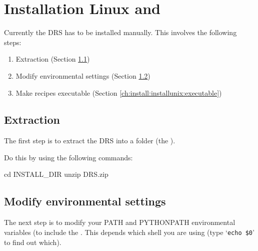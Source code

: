 \section{Installation Linux and \mac}
\label{ch:install:installunix}

Currently the DRS has to be installed manually. This involves the following steps:
\begin{enumerate}
\item Extraction (Section \ref{ch:install:installunix:extraction})
\item Modify environmental settings (Section \ref{ch:install:installunix:environ_settings})
\item Make recipes executable (Section \ref{ch:install:installunix:executable})
\end{enumerate}

\subsection{Extraction}
\label{ch:install:installunix:extraction}

The first step is to extract the DRS into a folder (the \InstallDIR).

\noindent Do this by using the following commands:
\begin{cmdbox}
cd INSTALL_DIR 
unzip DRS.zip
\end{cmdbox}

\subsection{Modify environmental settings}
\label{ch:install:installunix:environ_settings}

The next step is to modify your PATH and PYTHONPATH environmental variables (to include the \InstallDIR. This depends which shell you are using (type `\lstinline[style=bashstyle]{echo $0}' to find out which).

